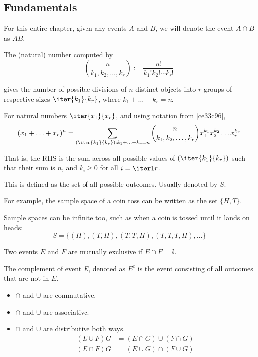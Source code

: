 \subsection{Fundamentals}\label{e028258}

For this entire chapter, given any events $A$ and $B$, we will denote the event
$A\cap B$ as $AB$.

\label{ce33c96}

The (natural) number computed by
$$
  \binom{n}{k_1,k_2,\ldots,k_r}:=\frac{n!}{k_1!k_2!\cdots k_r!}
$$

gives the number of possible divisions of $n$ distinct objects into $r$ groups
of respective sizes $\iter{k_1}{k_r}$, where $k_1+\ldots+k_r=n$.

\label{fa4d805}

For natural numbers $\iter{x_1}{x_r}$, and using notation from
\autoref{ce33c96},
$$
  (x_1+\ldots+x_r)^n
  =\sum_{(\iter{k_1}{k_r}):k_1+\ldots+k_r=n}\binom{n}{k_1,k_2,\ldots,k_r}
  x_1^{k_1}x_2^{k_2}\ldots x_r^{k_r}
$$

That is, the RHS is the sum across all possible values of $(\iter{k_1}{k_r})$
such that their sum is $n$, and $k_i\geq0$ for all $i=\iter1r$.

\label{dcc8547}

This is defined as the set of all possible outcomes. Usually denoted by $S$.

For example, the sample space of a coin toss can be written as the set
$\{H,T\}$.

Sample spaces can be infinite too, such as when a coin is tossed until it lands
on heads:
$$
  S=\{(H),(T,H),(T,T,H),(T,T,T,H),\ldots\}
$$

\label{a16826f}

Two events $E$ and $F$ are mutually exclusive if $E\cap F=\emptyset$.

\label{a89283f}

The complement of event $E$, denoted as $E^c$ is the event consisting of all
outcomes that are not in $E$.

\label{fc3d98b}

\begin{itemize}
  \item $\cap$ and $\cup$ are commutative.
  \item $\cap$ and $\cup$ are associative.
  \item $\cap$ and $\cup$ are distributive both ways.
        \begin{align*}
          (E\cup F)G &=(E\cap G)\cup(F\cap G) \\
          (E\cap F)G &=(E\cup G)\cap(F\cup G)
        \end{align*}
\end{itemize}

